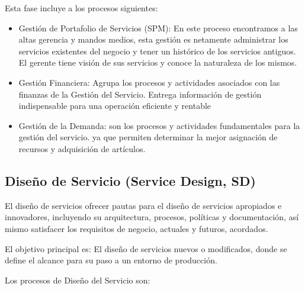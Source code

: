  Esta fase incluye a los procesos siguientes:
 
 \begin{itemize}
 	\item Gestión de Portafolio de Servicios (SPM): En este proceso encontramos a las altas gerencia y mandos medios, esta gestión es netamente administrar los servicios existentes del negocio y tener un histórico de los servicios antiguos. El gerente tiene  visión de sus servicios y conoce la naturaleza de los mismos. 
 	\item 	Gestión Financiera: Agrupa los procesos y actividades asociados con las finanzas de la Gestión del Servicio. Entrega información de gestión indispensable para una operación eficiente y rentable
 \item  Gestión de la Demanda: son los procesos y actividades fundamentales para la gestión del servicio. ya que  permiten determinar la mejor asignación de recursos y  adquisición de artículos.
 	
 \end{itemize}

\subsection{Diseño de Servicio (Service Design, SD)}

 
El diseño de servicios ofrecer pautas para el diseño de servicios apropiados e innovadores, incluyendo su arquitectura, procesos, políticas y documentación, así mismo satisfacer los requisitos de negocio, actuales y futuros, acordados.
 
El objetivo principal es: El diseño de servicios nuevos o modificados, donde se define el alcance para su paso a un entorno de producción.
 
 Los procesos de Diseño del Servicio son: 
 
